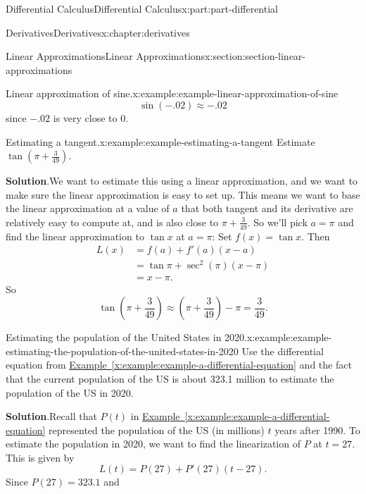 \documentclass[twoside,10pt,]{book}
\newcommand{\blocktitlefont}{\relax}
\newcommand{\xreffont}{\relax}
\numberwithin{equation}{part}
\begin{document}
\begin{partptx}{Differential Calculus}{}{Differential Calculus}{}{}{x:part:part-differential}
\begin{chapterptx}{Derivatives}{}{Derivatives}{}{}{x:chapter:derivatives}
\begin{sectionptx}{Linear Approximations}{}{Linear Approximations}{}{}{x:section:section-linear-approximations}
\begin{example}{Linear approximation of sine.}{x:example:example-linear-approximation-of-sine}
\begin{equation*}
\sin(-.02)\approx-.02
\end{equation*}
since \(-.02\) is very close to \(0\).%
\end{example}
\begin{example}{Estimating a tangent.}{x:example:example-estimating-a-tangent}%
Estimate \(\tan(\pi+\frac{3}{49})\).%
\par\smallskip%
\noindent\textbf{\blocktitlefont Solution}.\hypertarget{g:solution:idp105549212937632}{}\quad{}We want to estimate this using a linear approximation, and we want to make sure the linear approximation is easy to set up. This means we want to base the linear approximation at a value of \(a\) that both tangent and its derivative are relatively easy to compute at, and is also close to \(\pi+\frac{3}{49}\). So we'll pick \(a=\pi\) and find the linear approximation to \(\tan x\) at \(a = \pi\): Set \(f(x) = \tan x\). Then%
\begin{align*}
L(x) & = f(a) + f'(a)(x-a)\\
& = \tan\pi + \sec^{2}(\pi)(x-\pi) \\
& = x-\pi. 
\end{align*}
So%
\begin{equation*}
\tan(\pi+\frac{3}{49}) \approx (\pi+\frac{3}{49}) - \pi = \frac{3}{49}.
\end{equation*}
%
\end{example}
\begin{example}{Estimating the population of the United States in 2020.}{x:example:example-estimating-the-population-of-the-united-states-in-2020}%
Use the differential equation from \hyperref[x:example:example-a-differential-equation]{Example~{\xreffont\ref{x:example:example-a-differential-equation}}} and the fact that the current population of the US is about 323.1 million to estimate the population of the US in 2020.%
\par\smallskip%
\noindent\textbf{\blocktitlefont Solution}.\hypertarget{g:solution:idp105549212943136}{}\quad{}Recall that \(P(t)\) in \hyperref[x:example:example-a-differential-equation]{Example~{\xreffont\ref{x:example:example-a-differential-equation}}} represented the population of the US (in millions) \(t\) years after 1990. To estimate the population in 2020, we want to find the linearization of \(P\) at \(t = 27\). This is given by%
\begin{equation*}
L(t) = P(27) + P'(27)(t - 27).
\end{equation*}
Since \(P(27) = 323.1\) and%
\begin{equation*}

\end{equation*}
\end{example}
\end{sectionptx}
\end{chapterptx}
\end{partptx}
\end{document}
